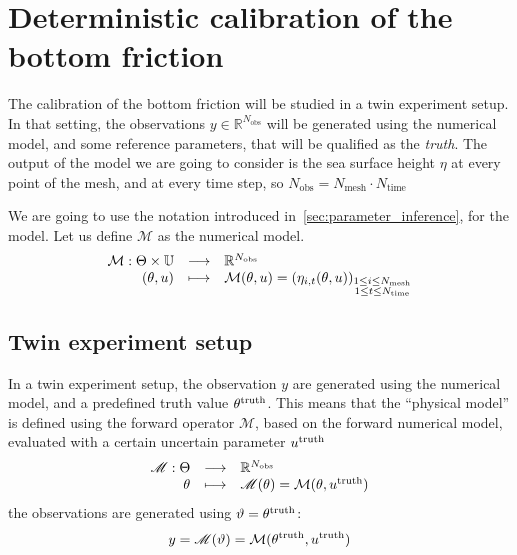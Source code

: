 \documentclass[../../Main_ManuscritThese.tex]{subfiles}
\begin{document}
\section{Deterministic calibration of the bottom friction}
\label{sec:deterministic_calibration_bott}
The calibration of the bottom friction will be studied in a twin
experiment setup. In that setting, the observations
$y \in \mathbb{R}^{N_{\mathrm{obs}}}$ will be generated using the
numerical model, and some reference parameters, that will be qualified
as the \emph{truth}. The output of the model we are going to consider
is the sea surface height $\eta$ at every point of the mesh, and at every
time step, so
$N_{\mathrm{obs}} = N_{\mathrm{mesh}}\cdot N_{\mathrm{time}}$

We are going to use the notation
introduced in~\cref{sec:parameter_inference}, for the model.  Let us
define $\mathcal{M}$ as the numerical model.
\begin{equation}
  \begin{array}{rcl}
    \mathcal{M}: \Theta \times \mathbb{U} &\longrightarrow& \mathbb{R}^{N_{\mathrm{obs}}} \\
    (\theta, u)& \longmapsto & \mathcal{M}(\theta, u) = \left(\eta_{i,t}(\theta, u)\right)_{\substack{1 \leq i \leq N_{\mathrm{mesh}} \\ 1 \leq t \leq N_{\mathrm{time}}}} \\ 
  \end{array}
\end{equation}

\subsection{Twin experiment setup}
In a twin experiment setup, the observation $y$ are
generated using the numerical model, and a predefined truth value $\theta^{\mathrm{truth}}$.
This means that the ``physical model'' is defined using the forward operator
$\mathscr{M}$, based on the forward numerical model, evaluated with a
certain uncertain parameter $u^{\mathrm{truth}}$
\begin{equation}
  \label{eq:twin_exp}
  \begin{array}{rcl}
    \mathscr{M}: \Theta &\longrightarrow & \mathbb{R}^{N_{\mathrm{obs}}} \\
      \theta & \longmapsto & \mathscr{M}(\theta) = \mathcal{M}(\theta, u^{\mathrm{truth}})
  \end{array}
\end{equation}
 the observations are generated using $\vartheta=\theta^{\mathrm{truth}}$:
\begin{equation}
  y = \mathscr{M}(\vartheta) = \mathcal{M}(\theta^{\mathrm{truth}}, u^{\mathrm{truth}})
\end{equation}
\end{document}
